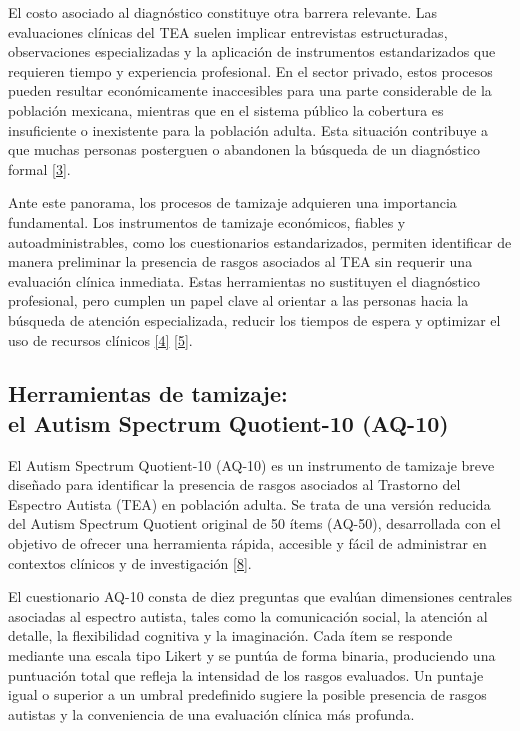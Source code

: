 El costo asociado al diagnóstico constituye otra barrera relevante. Las evaluaciones clínicas del TEA suelen implicar entrevistas estructuradas, observaciones especializadas y la aplicación de instrumentos estandarizados que requieren tiempo y experiencia profesional. En el sector privado, estos procesos pueden resultar económicamente inaccesibles para una parte considerable de la población mexicana, mientras que en el sistema público la cobertura es insuficiente o inexistente para la población adulta. Esta situación contribuye a que muchas personas posterguen o abandonen la búsqueda de un diagnóstico formal \hyperlink{3}{[3]}.

Ante este panorama, los procesos de tamizaje adquieren una importancia fundamental. Los instrumentos de tamizaje económicos, fiables y autoadministrables, como los cuestionarios estandarizados, permiten identificar de manera preliminar la presencia de rasgos asociados al TEA sin requerir una evaluación clínica inmediata. Estas herramientas no sustituyen el diagnóstico profesional, pero cumplen un papel clave al orientar a las personas hacia la búsqueda de atención especializada, reducir los tiempos de espera y optimizar el uso de recursos clínicos \hyperlink{4}{[4]} \hyperlink{5}{[5]}.

\subsection{Herramientas de tamizaje: \\ el Autism Spectrum Quotient-10 (AQ-10)}

El Autism Spectrum Quotient-10 (AQ-10) es un instrumento de tamizaje breve diseñado para identificar la presencia de rasgos asociados al Trastorno del Espectro Autista (TEA) en población adulta. Se trata de una versión reducida del Autism Spectrum Quotient original de 50 ítems (AQ-50), desarrollada con el objetivo de ofrecer una herramienta rápida, accesible y fácil de administrar en contextos clínicos y de investigación \hyperlink{8}{[8]}.

El cuestionario AQ-10 consta de diez preguntas que evalúan dimensiones centrales asociadas al espectro autista, tales como la comunicación social, la atención al detalle, la flexibilidad cognitiva y la imaginación. Cada ítem se responde mediante una escala tipo Likert y se puntúa de forma binaria, produciendo una puntuación total que refleja la intensidad de los rasgos evaluados. Un puntaje igual o superior a un umbral predefinido sugiere la posible presencia de rasgos autistas y la conveniencia de una evaluación clínica más profunda.

